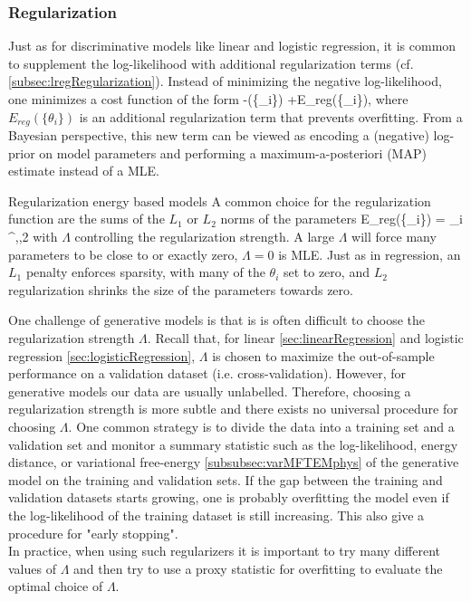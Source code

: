 \subsubsection{Regularization}
\label{subsubsec:energyCostfctRegularization}
Just as for discriminative models like linear and logistic regression, it is common to supplement the log-likelihood with additional regularization terms (cf. \ref{subsec:lregRegularization}). Instead of minimizing the negative log-likelihood, one minimizes a cost function of the form
\be 
-\mL(\{\theta_i\}) +E_{reg}(\{\theta_i\}),
\ee 
where $E_{reg}(\{\theta_i\})$ is an additional regularization term that prevents overfitting. From a Bayesian perspective, this new term can be viewed as encoding a (negative) log-prior on model parameters and performing a maximum-a-posteriori (MAP) estimate instead of a MLE.
\begin{mybox}{Regularization energy based models}
	A common choice for the regularization function are the sums of the $L_1$ or $L_2$ norms of the parameters
	\be 
	\label{eq:energyCostfctRegularizationFct}
	E_{reg}(\{\theta_i\}) = \Lambda \sum_i ^\alpha ,\quad {},2
	\ee 
	with $\Lambda$ controlling the regularization strength. A large $\Lambda$ will force many parameters to be close to or exactly zero, $\Lambda=0$ is MLE. Just as in regression, an $L_1$ penalty enforces sparsity, with many of the $\theta_i$ set to zero, and $L_2$ regularization shrinks the size of the parameters towards zero.
\end{mybox}
One challenge of generative models is that is is often difficult to choose the regularization strength $\Lambda$. Recall that, for linear \ref{sec:linearRegression} and logistic regression \ref{sec:logisticRegression}, $\Lambda$ is chosen to maximize the out-of-sample performance on a validation dataset (i.e. cross-validation). However, for generative models our data are usually unlabelled. Therefore, choosing a regularization strength is more subtle and there exists no universal procedure for choosing $\Lambda$. One common strategy is to divide the data into a training set and a validation set and monitor a summary statistic such as the log-likelihood, energy distance, or variational free-energy \ref{subsubsec:varMFTEMphys} of the generative model on the training and validation sets. If the gap between the training and validation datasets starts growing, one is probably overfitting the model even if the log-likelihood of the training dataset is still increasing. This also give a procedure for "early stopping".\\
In practice, when using such regularizers it is important to try many different values of $\Lambda$ and then try to use a proxy statistic for overfitting to evaluate the optimal choice of $\Lambda$.



